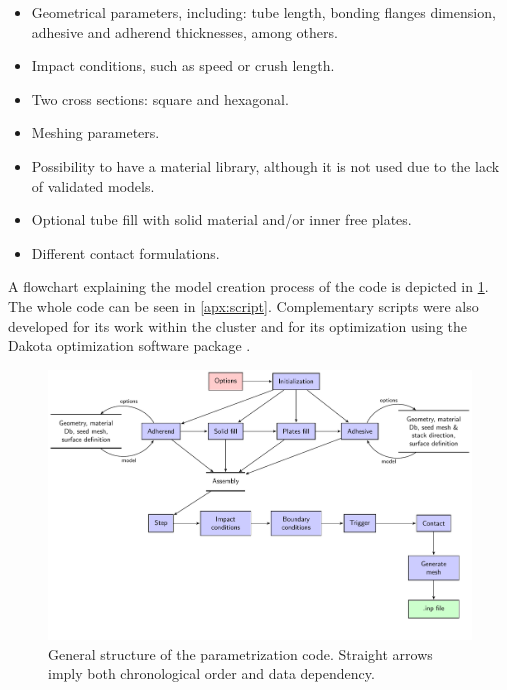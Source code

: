 \documentclass[
documentsize = a4, %
font = cmr, %
typesize = 11, %
printmode = true,
onehalfspacing = true,
language = en, %
titlepage = udciccp, %
degree = pt, %
dedication = true,
acknowledgements = true,
abstract-en = true,
abstract-es = false,
abstract-ga = false,
epigraphs = true,
toc = true,
lof = true,
lot = true,
frontmatterintoc = false,
notation = false,
minimal = false,
]{UDCthesis}
\begin{document}
\begin{itemize}
	\item Geometrical parameters, including: tube length, bonding flanges dimension, adhesive and adherend thicknesses, among others.

	\item Impact conditions, such as speed or crush length.

	\item Two cross sections: square and hexagonal.

	\item Meshing parameters.

	\item Possibility to have a material library, although it is not used due to the lack of validated models.

	\item Optional tube fill with solid material and/or inner free plates.

	\item Different contact formulations.
\end{itemize}

A flowchart explaining the model creation process of the code is depicted in \cref{fig:flow}. The whole code can be seen in \cref{apx:script}. Complementary scripts were also developed for its work within the cluster and for its optimization using the Dakota optimization software package \citep{dakota}.

\begin{figure}
	\centering
	\includegraphics[width=.95\linewidth]{flowchart/flow}
	\caption[General structure of the parameterized code.]{General structure of the parametrization code. Straight arrows imply both chronological order and data dependency.}
	\label{fig:flow}
\end{figure}
\end{document}
